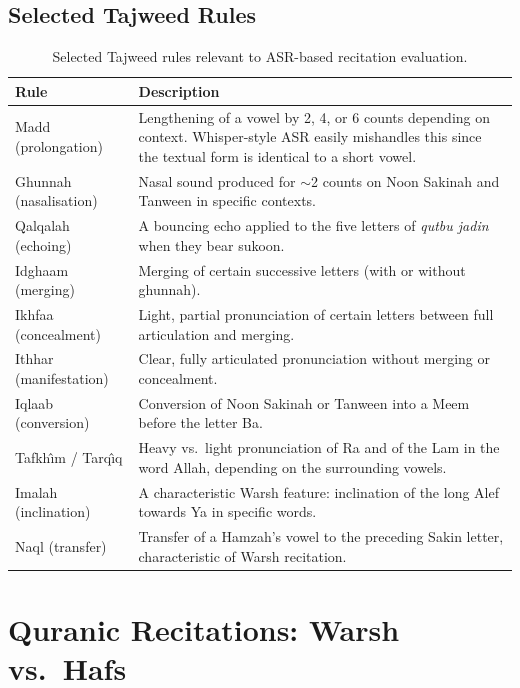 \subsection{Selected Tajweed Rules}

\begin{table}[H]
  \centering
  \caption{Selected Tajweed rules relevant to ASR-based recitation
  evaluation.}
  \label{tab:mt_tajweed_rules}
  \renewcommand{\arraystretch}{1.3}
  \begin{tabular}{lp{9.5cm}}
    \toprule
    \textbf{Rule} & \textbf{Description} \\
    \midrule
    Madd (prolongation) & Lengthening of a vowel by 2, 4, or 6 counts
    depending on context. Whisper-style ASR easily mishandles this since
    the textual form is identical to a short vowel. \\
    Ghunnah (nasalisation) & Nasal sound produced for $\sim$2 counts on
    Noon Sakinah and Tanween in specific contexts. \\
    Qalqalah (echoing) & A bouncing echo applied to the five letters of
    \textit{qutbu jadin} when they bear sukoon. \\
    Idghaam (merging) & Merging of certain successive letters (with or
    without ghunnah). \\
    Ikhfaa (concealment) & Light, partial pronunciation of certain
    letters between full articulation and merging. \\
    Ithhar (manifestation) & Clear, fully articulated pronunciation
    without merging or concealment. \\
    Iqlaab (conversion) & Conversion of Noon Sakinah or Tanween into a
    Meem before the letter Ba. \\
    Tafkh{\^\i}m / Tarq{\^\i}q & Heavy vs.\ light pronunciation of Ra and
    of the Lam in the word Allah, depending on the surrounding vowels. \\
    Imalah (inclination) & A characteristic Warsh feature: inclination of
    the long Alef towards Ya in specific words. \\
    Naql (transfer) & Transfer of a Hamzah's vowel to the preceding
    Sakin letter, characteristic of Warsh recitation. \\
    \bottomrule
  \end{tabular}
\end{table}

\section{Quranic Recitations: Warsh vs.\ Hafs}
\label{sec:mt_warsh_vs_hafs}

